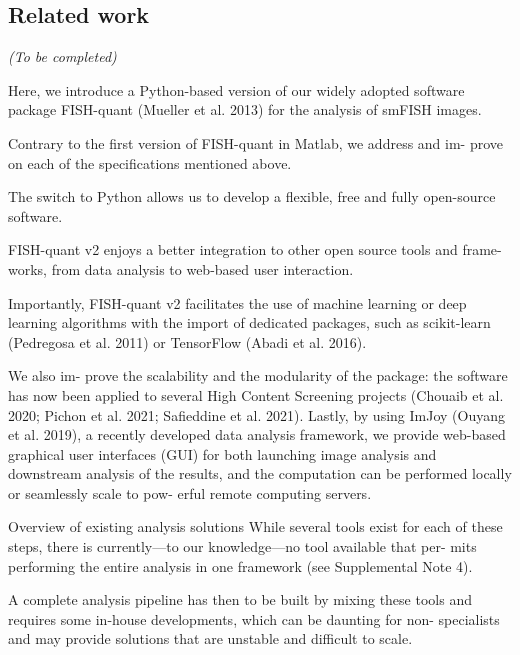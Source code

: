 \subsection{Related work}
\label{subsec:related_work_fishquant}

\begin{center}
	\textit{(To be completed)}
\end{center}




Here, we introduce a Python-based version of our widely adopted software package
FISH-quant (Mueller et al. 2013) for the analysis of smFISH images.

Contrary to
the first version of FISH-quant in Matlab, we address and im- prove on each of
the specifications mentioned above.

The switch to Python allows us to develop a
flexible, free and fully open-source software.

FISH-quant v2 enjoys a better
integration to other open source tools and frame- works, from data analysis to
web-based user interaction.

Importantly, FISH-quant v2 facilitates the use of
machine learning or deep learning algorithms with the import of dedicated packages,
such as scikit-learn (Pedregosa et al. 2011) or TensorFlow (Abadi et al. 2016).

We also im- prove the scalability and the modularity of the package: the software
has now been applied to several High Content Screening projects (Chouaib et
al. 2020; Pichon et al. 2021; Safieddine et al. 2021). Lastly, by using ImJoy (Ouyang et al. 2019),
a recently developed data analysis framework, we provide web-based graphical user
interfaces (GUI) for both launching image analysis and downstream analysis of the
results, and the computation can be performed locally or seamlessly scale to pow- erful remote computing servers.


Overview of existing analysis solutions
While several tools exist for each of these steps, there is currently—to our
knowledge—no tool available that per- mits performing the entire analysis in one
framework (see Supplemental Note 4).

A complete analysis pipeline has then to
be built by mixing these tools and requires some in-house developments, which
can be daunting for non- specialists and may provide solutions that are unstable
and difficult to scale.

